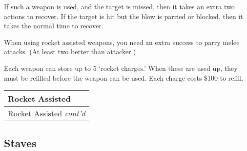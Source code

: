 \documentclass[twoside]{book}
\begin{document}
    {  
      If such a weapon is used, and the target is missed,
               then it takes an extra two actions to recover. If the
               target is hit but the blow is parried or blocked, then it
               takes the normal time to recover. 
    }
  
    {  
      When using rocket assisted weapons, you need an
               extra success to parry melee attacks. (At least two better
               than attacker.) 
    }
  
    {  
      Each weapon can store up to 5 `rocket
               charges.' When these are used up, they must be
               refilled before the weapon can be used. Each charge costs
               \$100 to refill. 
    }
  
\begin{longtable}{p{1.25in}} 
  Rocket Assisted\\
  \hline
  \hline
  \endfirsthead
  Rocket Assisted \textit{cont'd}
         \\
  \hline
  \endhead

\end{longtable}
    
\begin{multicols}{2}
    
\end{multicols}
  
    

\subsection{Staves}
    
\end{document}

